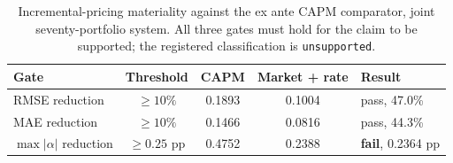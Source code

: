 \begin{table}[htbp]
\centering
\caption{Incremental-pricing materiality against the ex ante CAPM comparator,
joint seventy-portfolio system. All three gates must hold for the claim to be
supported; the registered classification is \texttt{unsupported}.}
\label{tab:h1}
\begin{tabular}{lcccl}
\toprule
Gate & Threshold & CAPM & Market + rate & Result \\
\midrule
RMSE reduction & $\geq 10\%$ & 0.1893 & 0.1004 & pass, 47.0\% \\ %
MAE reduction & $\geq 10\%$ & 0.1466 & 0.0816 & pass, 44.3\% \\ %
$\max|\alpha|$ reduction & $\geq 0.25$ pp & 0.4752 & 0.2388 & \textbf{fail}, 0.2364 pp \\ %
\bottomrule
\end{tabular}
\end{table}
